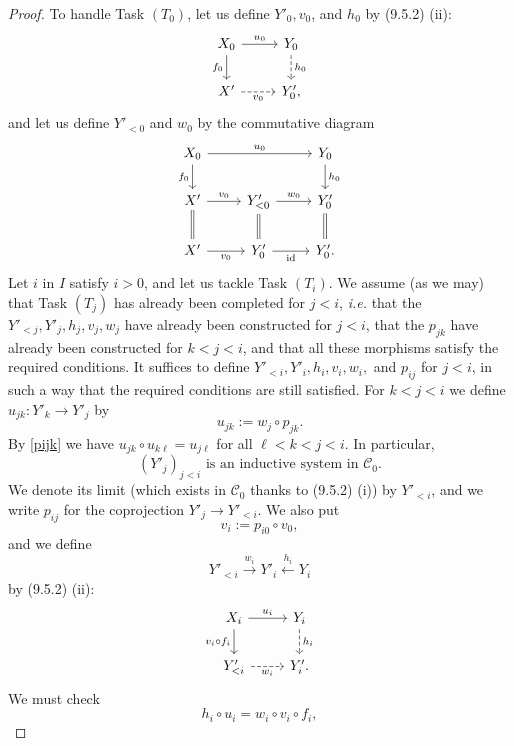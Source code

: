 \documentclass[12pt]{article}%
\theoremstyle{remark}
\theoremstyle{definition}
\newcommand{\C}{\mathcal C}
\newcommand{\xr}{\xrightarrow}
\DeclareMathOperator{\id}{id}
\begin{document}
\begin{proof}
To handle Task $(T_0)$, let us define $Y'_0,v_0$, and $h_0$ by (9.5.2) (ii):
$$
\begin{tikzcd}
X_0\ar{d}[swap]{f_0}\ar{r}{u_0}&Y_0\ar[dashed]{d}{h_0}\\
X'\ar[dashed]{r}[swap]{v_0}&Y'_0,
\end{tikzcd}
$$ 
and let us define $Y'_{<0}$ and $w_0$ by the commutative diagram
$$
\begin{tikzcd}
X_0\ar{rr}{u_0}\ar{d}[swap]{f_0}&&Y_0\ar{d}{h_0}\\
X'\ar{r}{v_0}\ar[equal]{d}&Y'_{<0}\ar{r}{w_0}\ar[equal]{d}&Y'_0\ar[equal]{d}\\
X'\ar{r}[swap]{v_0}&Y'_0\ar{r}[swap]{\id}&Y'_0.
\end{tikzcd}
$$
Let $i$ in $I$ satisfy $i>0$, and let us tackle Task $(T_i)$. We assume (as we may) that Task $(T_j)$ has already been completed for $j<i$, {\em i.e.} that the $Y'_{<j},Y'_j,h_j,v_j,w_j$ have already been constructed for $j<i$, that the $p_{jk}$ have already been constructed for $k<j<i$, and that all these morphisms satisfy the required conditions. It suffices to define $Y'_{<i},Y'_i,h_i,v_i,w_i,$ and $p_{ij}$ for $j<i$, in such a way that the required conditions are still satisfied. For $k<j<i$ we define $u_{jk}:Y'_k\to Y'_j$ by
%
\begin{equation}\label{ujk}
u_{jk}:=w_j\circ p_{jk}.
\end{equation}
%
By \eqref{pijk} we have $u_{jk}\circ u_{k\ell}=u_{j\ell}$ for all $\ell<k<j<i$. In particular, 
%
\begin{equation}\label{y'j}
(Y'_j)_{j<i}\text{ is an inductive system in }\C_0.
\end{equation}
%
We denote its limit (which exists in $\C_0$ thanks to (9.5.2) (i)) by $Y'_{<i}$, and we write $p_{ij}$ for the coprojection $Y'_j\to Y'_{<i}$. We also put
%
\begin{equation}\label{vi}
v_i:=p_{i0}\circ v_0,
\end{equation}
%
and we define
$$
Y'_{<i}\xr{w_i}Y'_i\xleftarrow{h_i}Y_i
$$
by (9.5.2) (ii):
%
\begin{equation}\label{hiui1}
\begin{tikzcd}
X_i\ar{d}[swap]{v_i\circ f_i}\ar{r}{u_i}&Y_i\ar[dashed]{d}{h_i}\\
Y'_{<i}\ar[dashed]{r}[swap]{w_i}&Y'_i.
\end{tikzcd}
\end{equation} 
%
We must check 
%
\begin{equation}\label{hiui2}
h_i\circ u_i=w_i\circ v_i\circ f_i,

\end{equation}
\end{proof}
\end{document}
